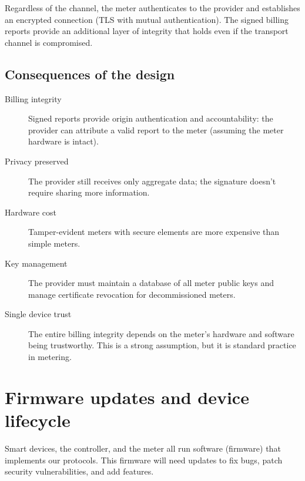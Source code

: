 Regardless of the channel, the meter authenticates to the provider and
establishes an encrypted connection (\eg TLS with mutual authentication).
The signed billing reports provide an additional layer of integrity that
holds even if the transport channel is compromised.

\subsection{Consequences of the design}

\begin{description}
  \item[Billing integrity] Signed reports provide origin authentication and
    accountability: the provider can attribute a valid report to the meter
    (assuming the meter hardware is intact).
  \item[Privacy preserved] The provider still receives only aggregate data;
    the signature doesn't require sharing more information.
  \item[Hardware cost] Tamper-evident meters with secure elements are more
    expensive than simple meters.
  \item[Key management] The provider must maintain a database of all meter
    public keys and manage certificate revocation for decommissioned meters.
  \item[Single device trust] The entire billing integrity depends on the
    meter's hardware and software being trustworthy.
    This is a strong assumption, but it is standard practice in metering.
\end{description}


\section{Firmware updates and device lifecycle}\label{EnergyFirmware}


Smart devices, the controller, and the meter all run software (firmware) that
implements our protocols.
This firmware will need updates to fix bugs, patch security vulnerabilities,
and add features.

